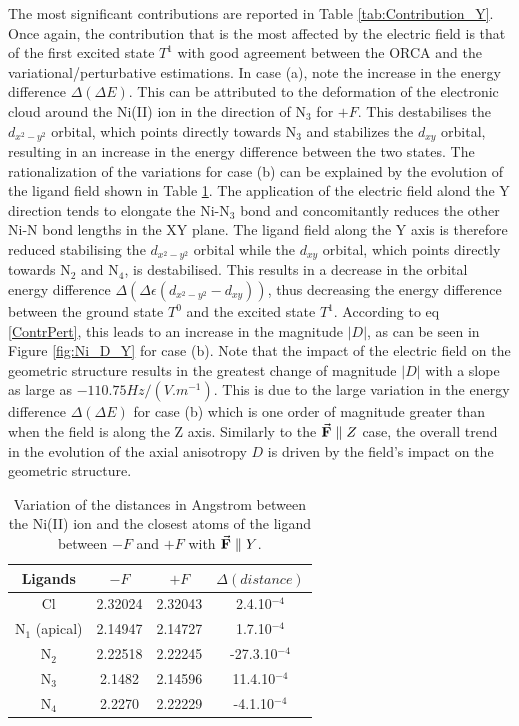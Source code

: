 \documentclass[12pt]{report}
\numberwithin{equation}{section}
\begin{document}
The most significant contributions are reported in Table \ref{tab:Contribution_Y}. 
Once again, the contribution that is the most affected by the electric field is that of the first excited state $T^1$ with good agreement between the ORCA and the variational/perturbative estimations.
In case (a), note the increase in the energy difference $\Delta (\Delta E)$.
This can be attributed to the deformation of the electronic cloud around the Ni(II) ion in the direction of N$_3$ for $+F$. 
This destabilises the $d_{x^2-y^2}$ orbital, which points directly towards N$_3$ and stabilizes the $d_{xy}$ orbital, resulting in an increase in the energy difference between the two states.
The rationalization of the variations for case (b) can be explained by the evolution of the ligand field shown in Table \ref{tab:DistanceY}.
The application of the electric field alond the Y direction tends to elongate the Ni-N$_3$ bond and concomitantly reduces the other Ni-N bond lengths in the XY plane.
The ligand field along the Y axis is therefore reduced stabilising the $d_{x^2-y^2}$ orbital while the $d_{xy}$ orbital, which points directly towards N$_2$ and N$_4$, is destabilised. 
This results in a decrease in the orbital energy difference $\Delta (\Delta \epsilon (d_{x^2-y^2}-d_{xy}))$, thus decreasing the energy difference between the ground state $T^0$ and the excited state $T^1$.
According to eq \ref{ContrPert}, this leads to an increase in the magnitude $|D|$, as can be seen in Figure \ref{fig:Ni_D_Y} for case (b).
Note that the impact of the electric field on the geometric structure results in the greatest change of magnitude $|D|$ with a slope as large as $-110.75 Hz/(V.m^{-1})$.
This is due to the large variation in the energy difference $\Delta (\Delta E)$ for case (b) which is one order of magnitude greater than when the field is along the Z axis.
Similarly to the $\vec{\vb{F}}\parallel Z$ case, the overall trend in the evolution of the axial anisotropy $D$ is driven by the field's impact on the geometric structure.


\begin{table}[!ht]
    \centering
    \begin{tabular}{| c | c| c | c |}
        \hline
        Ligands & $-F$ & $+F$ &$\Delta(distance)$\\
        \hline
        Cl & 2.32024& 2.32043&  2.4.10$^{-4}$\\
        N$_1$ (apical) & 2.14947  & 2.14727 &1.7.10$^{-4}$\\
        N$_2$ & 2.22518& 2.22245&-27.3.10$^{-4}$ \\
        N$_3$ & 2.1482& 2.14596&11.4.10$^{-4}$ \\
        N$_4$ & 2.2270& 2.22229 &-4.1.10$^{-4}$\\
        \hline
    \end{tabular}
    \caption{Variation of the distances in Angstrom between the Ni(II) ion and the closest atoms of the ligand between $-F$ and $+F$ with $\vec{\vb{F}}\parallel Y$.}
    \label{tab:DistanceY}
\end{table}
\end{document}
